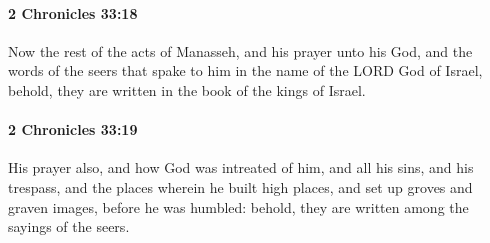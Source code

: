 		\paragraph{2 Chronicles 33:18} %
			\label{2CHRONICLES-33-18}

			Now the rest of the acts of Manasseh, and his prayer unto his God, and the words of the seers that spake to him in the name of the LORD God of Israel, behold, they are written in the book of the kings of Israel.


		\paragraph{2 Chronicles 33:19} %
			\label{2CHRONICLES-33-19}

			His prayer also, and how God was intreated of him, and all his sins, and his trespass, and the places wherein he built high places, and set up groves and graven images, before he was humbled: behold, they are written among the sayings of the seers.


